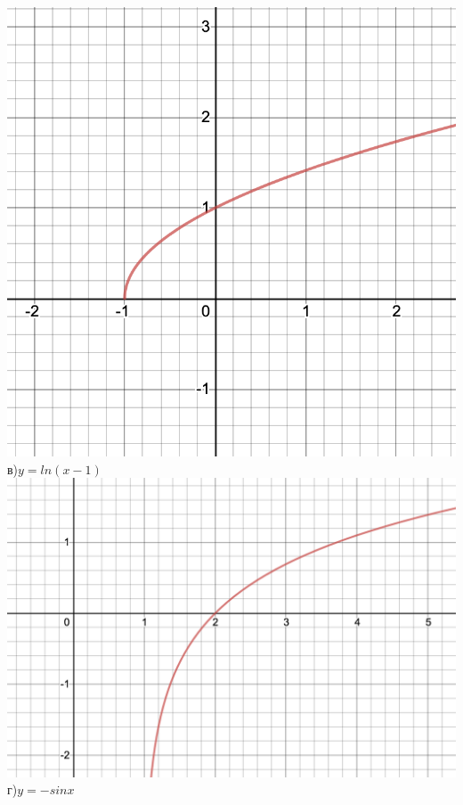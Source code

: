 \documentclass[a4paper]{article}
\begin{document}
    \includegraphics[scale=0.1]{b}\\
    в)$y=ln(x-1)$
    \includegraphics[scale=0.1]{c}
    г)$y=-sinx$
\end{document}
